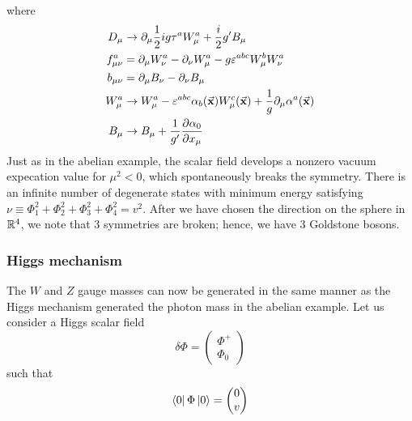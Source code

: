 \documentclass[../main/main.tex]{subfiles}
\begin{document}
where
\begin{subequations}
\begin{align*}
     D_ \mu  &\rightarrow \partial_ \mu \frac{1}{2} i g \tau ^a W_ \mu ^a + \frac{i}{2} g' B _ \mu \\
  f_ {\mu \nu }^a &= \partial_ \mu W_ \nu ^a - \partial_ \nu W _ \mu ^a - g \varepsilon ^{abc} W _ \mu ^b  W_ \nu ^a \\
  b_ {\mu \nu } &= \partial_ \mu B _ \nu - \partial_ \nu  B _ \mu \\
  W_ \mu ^a & \rightarrow W_ \mu ^a - \varepsilon ^{abc} \alpha _b (\va{x}) W_ \mu ^c (\va{x}) + \frac{1}{g} \partial_ \mu \alpha ^a (\va{x})    \\
  B _ \mu  & \rightarrow  B _ \mu + \frac{1}{g'} \pdv{\alpha _0}{x_ \mu }
\end{align*}
\end{subequations}
Just as in the abelian example, the scalar field develops a nonzero vacuum expecation value for \( \mu ^2 <0 \), which spontaneously breaks the symmetry. There is an infinite number of degenerate states with minimum energy satisfying  \( \nu \equiv  \Phi _1^2 + \Phi _2^2 + \Phi _3^2 +\Phi _4^2 = v^2 \). After we have chosen the direction on the sphere in  \( \mathbb{R}^4 \), we note that 3 symmetries are broken; hence, we have 3 Goldstone bosons.

\subsubsection{Higgs mechanism}
The \( W \)  and \( Z \)  gauge masses can now be generated in the same manner as the Higgs mechanism generated the photon mass in the abelian example.
Let us consider a Higgs scalar field
\begin{equation*}
  \delta \Phi = \begin{pmatrix}
  \Phi ^+ \\
  \Phi _0
  \end{pmatrix}
\end{equation*}
such that
\begin{equation*}
  \bra{0} \Phi \ket{0} = \begin{pmatrix}
  0 \\
  v
  \end{pmatrix}
\end{equation*}
\end{document}
